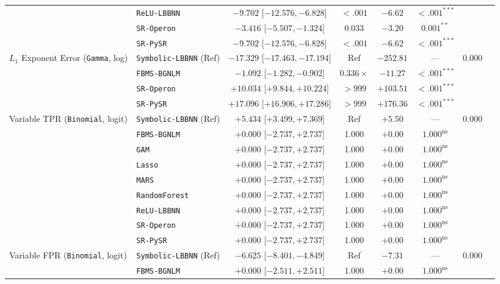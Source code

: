 \begin{table}[htbp]
{{\begin{tabular}{llcccccc}
 & \texttt{ReLU-LBBNN} & $-9.702$ [$-12.576, -6.828$] & $<.001$ & $-6.62$ & $<.001^{***}$ &  \\
 & \texttt{SR-Operon} & $-3.416$ [$-5.507, -1.324$] & 0.033 & $-3.20$ & $0.001^{**}$ &  \\
 & \texttt{SR-PySR} & $-9.702$ [$-12.576, -6.828$] & $<.001$ & $-6.62$ & $<.001^{***}$ &  \\
\midrule
$L_1$ Exponent Error (\texttt{Gamma}, log) & \texttt{Symbolic-LBBNN} (Ref) & $-17.329$ [$-17.463, -17.194$] & Ref & $-252.81$ & --- & 0.000 \\
 & \texttt{FBMS-BGNLM} & $-1.092$ [$-1.282, -0.902$] & $0.336\times$ & $-11.27$ & $<.001^{***}$ &  \\
 & \texttt{SR-Operon} & $+10.034$ [$+9.844, +10.224$] & $>999$ & $+103.51$ & $<.001^{***}$ &  \\
 & \texttt{SR-PySR} & $+17.096$ [$+16.906, +17.286$] & $>999$ & $+176.36$ & $<.001^{***}$ &  \\
\midrule
Variable TPR (\texttt{Binomial}, logit) & \texttt{Symbolic-LBBNN} (Ref) & $+5.434$ [$+3.499, +7.369$] & Ref & $+5.50$ & --- & 0.000 \\
 & \texttt{FBMS-BGNLM} & $+0.000$ [$-2.737, +2.737$] & 1.000 & $+0.00$ & $1.000^{\text{ns}}$ &  \\
 & \texttt{GAM} & $+0.000$ [$-2.737, +2.737$] & 1.000 & $+0.00$ & $1.000^{\text{ns}}$ &  \\
 & \texttt{Lasso} & $+0.000$ [$-2.737, +2.737$] & 1.000 & $+0.00$ & $1.000^{\text{ns}}$ &  \\
 & \texttt{MARS} & $+0.000$ [$-2.737, +2.737$] & 1.000 & $+0.00$ & $1.000^{\text{ns}}$ &  \\
 & \texttt{RandomForest} & $+0.000$ [$-2.737, +2.737$] & 1.000 & $+0.00$ & $1.000^{\text{ns}}$ &  \\
 & \texttt{ReLU-LBBNN} & $+0.000$ [$-2.737, +2.737$] & 1.000 & $+0.00$ & $1.000^{\text{ns}}$ &  \\
 & \texttt{SR-Operon} & $+0.000$ [$-2.737, +2.737$] & 1.000 & $+0.00$ & $1.000^{\text{ns}}$ &  \\
 & \texttt{SR-PySR} & $+0.000$ [$-2.737, +2.737$] & 1.000 & $+0.00$ & $1.000^{\text{ns}}$ &  \\
\midrule
Variable FPR (\texttt{Binomial}, logit) & \texttt{Symbolic-LBBNN} (Ref) & $-6.625$ [$-8.401, -4.849$] & Ref & $-7.31$ & --- & 0.000 \\
 & \texttt{FBMS-BGNLM} & $+0.000$ [$-2.511, +2.511$] & 1.000 & $+0.00$ & $1.000^{\text{ns}}$ &  \\

\end{tabular}}}
\end{table}
